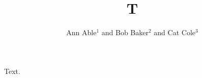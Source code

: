 \documentclass{revtex4-1}
\begin{document}
\title{T}
\author{Ann Able$^{1}$ and Bob Baker$^{2}$ and Cat Cole$^{3}$}
\maketitle
Text.
\end{document}
